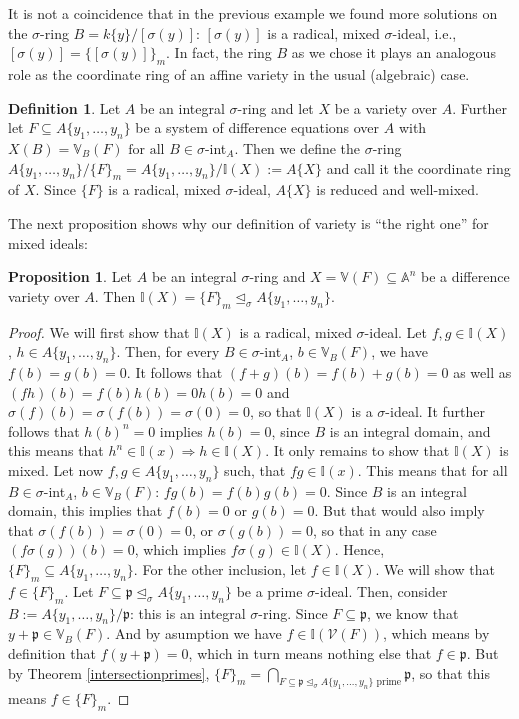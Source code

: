 \documentclass{article}
\def\I{\mathbb{I}}
\def\V{\mathcal{V}}
\def\VV{\mathbb{V}}
\def\p{\mathfrak{p}}
\def\s{\sigma}
\def\si{\unlhd_{\sigma}}
\def\fa{\text{ for all }}
\newenvironment{bew}{\begin{proof}[Proof]}{\end{proof}}
\theoremstyle{definition}
\newtheorem{prop}[Satz]{Proposition}
\newtheorem{defn}[Satz]{Definition}
\begin{document}
It is not a coincidence that in the previous example we found more solutions on the $\s$-ring $B = k\{y\}/[\s(y)]$: $[\s(y)]$ is a radical, mixed $\s$-ideal, i.e., $[\s(y)] = \{ [\s(y)] \}_m$.
In fact, the ring $B$ as we chose it plays an analogous role as the coordinate ring of an affine variety in the usual (algebraic) case.

\begin{defn}
Let $A$ be an integral $\s$-ring and let $X$ be a variety over $A$. Further let $F \subseteq A\{y_1, \ldots, y_n\}$ be a system of difference equations over $A$ with $X(B) = \VV_B(F) \fa B \in \s$-int$_A$.
Then we define the $\s$-ring $A\{y_1, \ldots, y_n\}/\{F\}_m = A\{y_1, \ldots, y_n\}/\I(X) := A\{X\}$ and call it the coordinate ring of $X$. Since $\{F\}$ is a radical, mixed $\s$-ideal, $A\{X\}$ is reduced and well-mixed.
\end{defn}

The next proposition shows why our definition of variety is ``the right one'' for mixed ideals:

\begin{prop}\label{I=F_m}
Let $A$ be an integral $\s$-ring and $X = \VV(F) \subseteq \mathbb{A}^n$ be a difference variety over $A$. Then $\I(X) = \{F\}_m \si A\{y_1,\ldots,y_n\}$. 
\begin{bew}
We will first show that $\I(X)$ is a radical, mixed $\s$-ideal.
Let $f, g \in \I(X)$, $h \in A\{y_1,\ldots,y_n\}$. Then, for every $B \in \s$-int$_A$, $b \in \VV_B(F)$, we have $f(b) = g(b) = 0$.
It follows that $(f + g)(b) = f(b) + g(b) = 0$ as well as $(fh)(b) = f(b)h(b) = 0 h(b) = 0$ and $\s(f)(b) = \s(f(b)) = \s(0) = 0$, so that $\I(X)$ is a $\s$-ideal.
It further follows that $h(b)^n = 0$ implies $h(b) = 0$, since $B$ is an integral domain, and this means that $h^n \in \I(x) \Rightarrow h \in \I(X)$. It only remains to show that $\I(X)$ is mixed.
Let now $f,g \in A\{y_1,\ldots,y_n\}$ such, that $fg \in \I(x)$. This means that for all  $B \in \s$-int$_A$, $b \in \VV_B(F)$: $fg(b) = f(b) g(b) = 0$. Since $B$ is an integral domain,
this implies that $f(b) = 0$ or $g(b) = 0$. But that would also imply that $\s(f(b)) = \s(0) = 0$, or $\s(g(b)) = 0$, so that in any case $(f\s(g))(b) = 0$, which implies $f\s(g) \in \I(X)$.
Hence, $\{F\}_m \subseteq A\{y_1,\ldots,y_n\}$. For the other inclusion, let $f \in \I(X)$. We will show that $f \in \{F\}_m$. Let $F \subseteq \p \si A\{y_1,\ldots,y_n\}$ be a prime $\s$-ideal.
Then, consider $B:= A\{y_1,\ldots,y_n\}/\p$: this is an integral $\s$-ring. Since $F \subseteq \p$, we know that $y + \p \in \VV_B(F)$. And by asumption we have $f \in \I(\V(F))$, which means by definition that $f(y + \p) = 0$, which
in turn means nothing else that $f \in \p$. But by Theorem \ref{intersectionprimes}, $\{F\}_m = \bigcap_{F \subseteq \p \si A\{y_1,\ldots,y_n\} \text{ prime}} \p$, so that this means $f \in \{F\}_m$.
\end{bew}
\end{prop}
\end{document}
